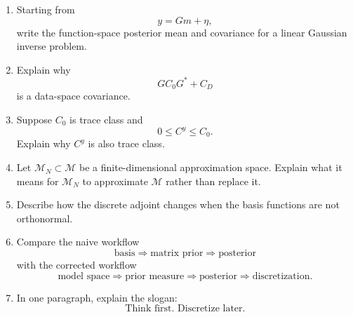 \documentclass[11pt,a4paper]{book}
\newcommand{\M}{\mathcal{M}}      %
\newcommand{\noise}{\eta}
\newcommand{\obs}{y}
\newcommand{\G}{G}
\newcommand{\Gadj}{G^\ast}
\begin{document}
\begin{enumerate}[label=\textbf{VII.\arabic*.}]
    \item Starting from
    \[
        \obs=\G m+\noise,
    \]
    write the function-space posterior mean and covariance for a linear
    Gaussian inverse problem.

    \item Explain why
    \[
        \G C_0\Gadj+C_D
    \]
    is a data-space covariance.

    \item Suppose $C_0$ is trace class and
    \[
        0\leq C^y\leq C_0.
    \]
    Explain why $C^y$ is also trace class.

    \item Let $\M_N\subset\M$ be a finite-dimensional approximation space.
    Explain what it means for $\M_N$ to approximate $\M$ rather than replace it.

    \item Describe how the discrete adjoint changes when the basis functions
    are not orthonormal.

    \item Compare the naive workflow
    \[
        \text{basis}\Rightarrow\text{matrix prior}\Rightarrow\text{posterior}
    \]
    with the corrected workflow
    \[
        \text{model space}\Rightarrow\text{prior measure}
        \Rightarrow\text{posterior}\Rightarrow\text{discretization}.
    \]

    \item In one paragraph, explain the slogan:
    \[
        \text{Think first. Discretize later.}
    \]
\end{enumerate}




\end{document}
